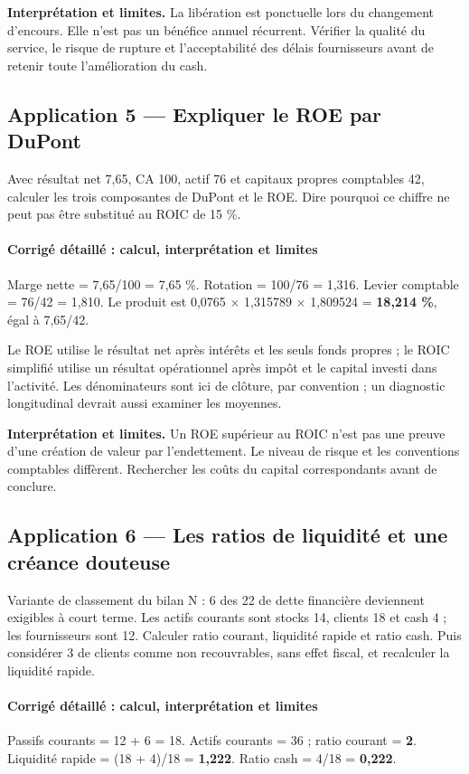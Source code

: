 \documentclass[12pt,a4paper]{article}
\begin{document}
\textbf{Interprétation et limites.} La libération est ponctuelle lors du changement d’encours. Elle n’est pas un bénéfice annuel récurrent. Vérifier la qualité du service, le risque de rupture et l’acceptabilité des délais fournisseurs avant de retenir toute l’amélioration du cash.


\subsection*{Application 5 --- Expliquer le ROE par DuPont}
Avec résultat net 7,65, CA 100, actif 76 et capitaux propres comptables 42, calculer les trois composantes de DuPont et le ROE. Dire pourquoi ce chiffre ne peut pas être substitué au ROIC de 15 \%.


\paragraph{Corrigé détaillé : calcul, interprétation et limites}
Marge nette = 7,65/100 = 7,65 \%. Rotation = 100/76 = 1,316. Levier comptable = 76/42 = 1,810. Le produit est 0,0765 $\times$ 1,315789 $\times$ 1,809524 = \textbf{18,214 \%}, égal à 7,65/42.

Le ROE utilise le résultat net après intérêts et les seuls fonds propres ; le ROIC simplifié utilise un résultat opérationnel après impôt et le capital investi dans l’activité. Les dénominateurs sont ici de clôture, par convention ; un diagnostic longitudinal devrait aussi examiner les moyennes.

\textbf{Interprétation et limites.} Un ROE supérieur au ROIC n’est pas une preuve d’une création de valeur par l’endettement. Le niveau de risque et les conventions comptables diffèrent. Rechercher les coûts du capital correspondants avant de conclure.


\subsection*{Application 6 --- Les ratios de liquidité et une créance douteuse}
Variante de classement du bilan N : 6 des 22 de dette financière deviennent exigibles à court terme. Les actifs courants sont stocks 14, clients 18 et cash 4 ; les fournisseurs sont 12. Calculer ratio courant, liquidité rapide et ratio cash. Puis considérer 3 de clients comme non recouvrables, sans effet fiscal, et recalculer la liquidité rapide.


\paragraph{Corrigé détaillé : calcul, interprétation et limites}
Passifs courants = 12 + 6 = 18. Actifs courants = 36 ; ratio courant = \textbf{2}. Liquidité rapide = (18 + 4)/18 = \textbf{1,222}. Ratio cash = 4/18 = \textbf{0,222}.
\end{document}
